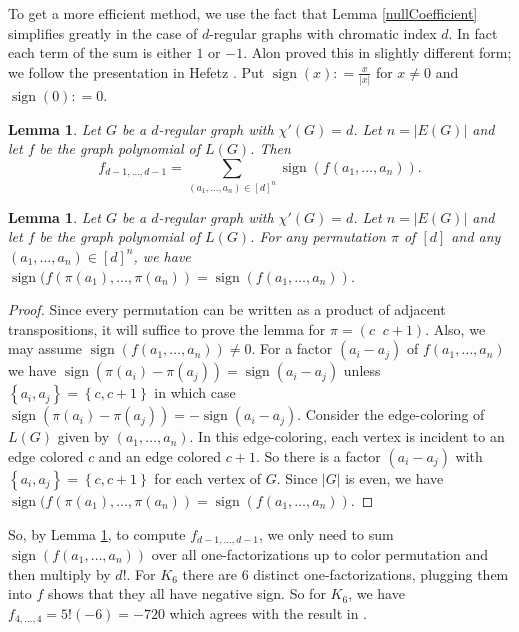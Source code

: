 \documentclass[12pt]{article}
\theoremstyle{plain}
\newtheorem{lem}[thm]{Lemma}
\theoremstyle{definition}
\theoremstyle{remark}
\newcommand{\set}[1]{\left\{ #1 \right\}}
\newcommand{\card}[1]{\left|#1\right|}
\newcommand{\irange}[1]{\left[#1\right]}
\newcommand{\DefinedAs}{\mathrel{\mathop:}=}
\newcommand{\sign}{\operatorname{sign}}
\begin{document}
To get a more efficient method, we use the fact that Lemma \ref{nullCoefficient} simplifies greatly in the case of $d$-regular graphs with chromatic index $d$.  In fact each term of the sum is either $1$ or $-1$. Alon \cite{alon1993restricted} proved this in slightly different form; we follow the presentation in Hefetz \cite{hefetz2011two}.  Put $\sign(x) \DefinedAs \frac{x}{|x|}$ for $x \ne 0$ and $\sign(0) \DefinedAs 0$.  

\begin{lem}\label{nullSign}
Let $G$ be a $d$-regular graph with $\chi'(G) = d$. Let $n = \card{E(G)}$ and let $f$ be the graph polynomial of $L(G)$. Then
\[f_{d-1, \ldots, d-1} = \sum_{(a_1, \ldots, a_n) \in \irange{d}^n} \sign(f(a_1, \ldots, a_n)).\]
\end{lem}

\begin{lem}\label{permuteColors}
Let $G$ be a $d$-regular graph with $\chi'(G) = d$. Let $n = \card{E(G)}$ and let $f$ be the graph polynomial of $L(G)$.  For any permutation $\pi$ of $\irange{d}$ and any $(a_1, \ldots, a_n) \in \irange{d}^n$, we have
$\sign(f(\pi(a_1), \ldots, \pi(a_n)) = \sign(f(a_1, \ldots, a_n))$.
\end{lem}
\begin{proof}
Since every permutation can be written as a product of adjacent transpositions, it will suffice to prove the lemma for $\pi = (c\;\; c\!+\!1)$.  Also, we may assume $\sign(f(a_1, \ldots, a_n)) \ne 0$.  For a factor $(a_i - a_j)$ of $f(a_1, \ldots, a_n)$ we have $\sign(\pi(a_i) - \pi(a_j)) = \sign(a_i-a_j)$ unless $\set{a_i, a_j} = \set{c, c+1}$ in which case $\sign(\pi(a_i) - \pi(a_j)) = -\sign(a_i-a_j)$.  Consider the edge-coloring of $L(G)$ given by $(a_1, \ldots, a_n)$.  In this edge-coloring, each vertex is incident to an edge colored $c$ and an edge colored $c+1$. So there is a factor $(a_i - a_j)$ with $\set{a_i, a_j} = \set{c, c+1}$ for each vertex of $G$.  Since $\card{G}$ is even, we have
$\sign(f(\pi(a_1), \ldots, \pi(a_n)) = \sign(f(a_1, \ldots, a_n))$.
\end{proof}

So, by Lemma \ref{permuteColors}, to compute $f_{d-1, \ldots, d-1}$, we only need to sum $\sign(f(a_1, \ldots, a_n))$ over all one-factorizations up to color permutation and then multiply by $d!$.  For $K_6$ there are $6$ distinct one-factorizations, plugging them into $f$ shows that they all have negative sign.  So for $K_6$, we have $f_{4,\ldots, 4} = 5!(-6) = -720$ which agrees with the result in \cite{cariolaro2014list}.
\end{document}
